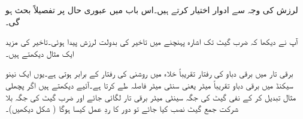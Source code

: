  لرزش کی وجہ سے ادوار   اختیار کرتے ہیں۔اس باب میں عبوری حال پر تفصیلاً بحث ہو گی۔ 

آپ نے دیکھا کہ ضرب گیٹ تک اشارہ  پہنچنے میں تاخیر کی بدولت لرزش پیدا ہوئی۔تاخیر کی مزید ایک مثال دیکھتے ہیں۔

برقی تار میں برقی دباو کی رفتار تقریباً خلاء میں روشنی کی رفتار کے برابر ہوتی ہے۔یوں ایک نینو سیکنڈ میں برقی دباو تقریباً  میٹر یعنی  سنٹی میٹر فاصلہ طے کرتا ہے۔آئیے دیکھتے ہیں اگر پچھلی مثال تبدیل کر کے نفی گیٹ کی جگہ  سینٹی میٹر برقی تار لگائی جائے اور ضرب گیٹ کی جگہ بلا شرکت جمع گیٹ نصب کیا جائے تو دور کا ردِ عمل کیسا ہوگا ( شکل  دیکھیں)۔

